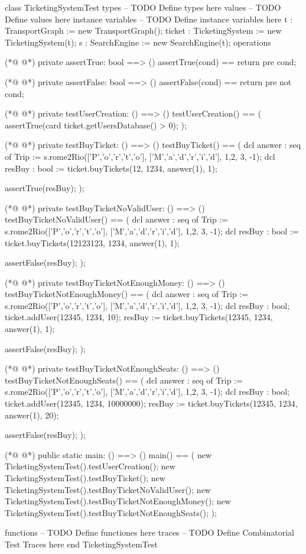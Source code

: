 \begin{vdmpp}[breaklines=true]
class TicketingSystemTest
types
-- TODO Define types here
values
-- TODO Define values here
instance variables
-- TODO Define instance variables here
 t : TransportGraph := new TransportGraph();
 ticket : TicketingSystem := new TicketingSystem(t);
 s : SearchEngine := new SearchEngine(t);
operations

(*@
\label{assertTrue:13}
@*)
 private assertTrue: bool ==> ()
  assertTrue(cond) == return
  pre cond;
  
(*@
\label{assertFalse:17}
@*)
  private assertFalse: bool ==> ()
  assertFalse(cond) == return
  pre not cond;
  
(*@
\label{testUserCreation:21}
@*)
  private testUserCreation: () ==> ()
 testUserCreation() == (
   assertTrue(card ticket.getUsersDatabase() > 0);
 );
 
(*@
\label{testBuyTicket:26}
@*)
 private testBuyTicket: () ==> ()
 testBuyTicket() == (
  dcl answer : seq of Trip := s.rome2Rio(['P','o','r','t','o'], ['M','a','d','r','i','d'], {1,2}, 3, -1);
  dcl resBuy : bool := ticket.buyTickets(12, 1234, answer(1), 1);
  
  assertTrue(resBuy);
 );
 
(*@
\label{testBuyTicketNoValidUser:34}
@*)
 private testBuyTicketNoValidUser: () ==> ()
 testBuyTicketNoValidUser() == (
  dcl answer : seq of Trip := s.rome2Rio(['P','o','r','t','o'], ['M','a','d','r','i','d'], {1,2}, 3, -1);
  dcl resBuy : bool := ticket.buyTickets(12123123, 1234, answer(1), 1);
  
  assertFalse(resBuy);
 );
 
(*@
\label{testBuyTicketNotEnoughMoney:42}
@*)
 private testBuyTicketNotEnoughMoney: () ==> ()
 testBuyTicketNotEnoughMoney() == (
  dcl answer : seq of Trip := s.rome2Rio(['P','o','r','t','o'], ['M','a','d','r','i','d'], {1,2}, 3, -1);
  dcl resBuy : bool;
  ticket.addUser(12345, 1234, 10);
  resBuy := ticket.buyTickets(12345, 1234, answer(1), 1);
  
  assertFalse(resBuy);
 );
 
(*@
\label{testBuyTicketNotEnoughSeats:52}
@*)
 private testBuyTicketNotEnoughSeats: () ==> ()
 testBuyTicketNotEnoughSeats() == (
  dcl answer : seq of Trip := s.rome2Rio(['P','o','r','t','o'], ['M','a','d','r','i','d'], {1,2}, 3, -1);
  dcl resBuy : bool;
  ticket.addUser(12345, 1234, 10000000);
  resBuy := ticket.buyTickets(12345, 1234, answer(1), 20);
  
  assertFalse(resBuy);
 );
  
(*@
\label{main:62}
@*)
  public static main: () ==> ()
 main() == (
    new TicketingSystemTest().testUserCreation();
    new TicketingSystemTest().testBuyTicket();
    new TicketingSystemTest().testBuyTicketNoValidUser();
    new TicketingSystemTest().testBuyTicketNotEnoughMoney();
    new TicketingSystemTest().testBuyTicketNotEnoughSeats();
 );
  
functions
-- TODO Define functiones here
traces
-- TODO Define Combinatorial Test Traces here
end TicketingSystemTest
\end{vdmpp}

